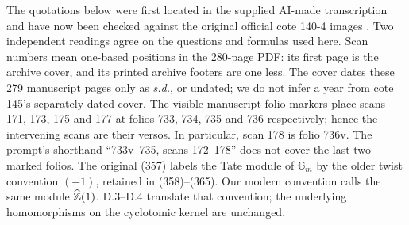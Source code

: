 The quotations below were first located in the supplied AI-made
transcription and have now been checked against the original official
cote 140-4 images \citep[scans 167--178]{GrothendieckLongueMarche}.
Two independent readings agree on the questions and formulas used here.
Scan numbers mean one-based positions in the 280-page PDF: its first
page is the archive cover, and its printed archive footers are one less.
The cover dates these 279 manuscript pages only as \emph{s.d.}, or
undated; we do not infer a year from cote 145's separately dated cover.
The visible manuscript folio markers place scans 171, 173, 175
and 177 at folios 733, 734, 735 and 736 respectively; hence the intervening
scans are their versos. In particular, scan 178 is folio 736v.
The prompt's shorthand ``733v--735, scans 172--178'' does not
cover the last two marked folios.
The original (357) labels the Tate module of $\mathbb G_m$
by the older twist convention $(-1)$, retained in (358)--(365).
Our modern convention calls the same module $\widehat{\mathbb Z}(1)$.
D.3--D.4 translate that convention; the underlying homomorphisms on
the cyclotomic kernel are unchanged.

